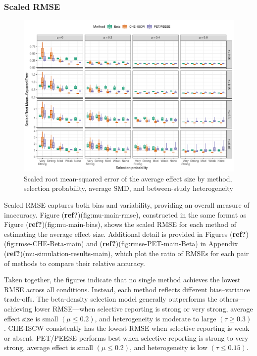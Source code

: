 \documentclass[
  american,
  man, donotrepeattitle,floatsintext]{apa7}
\begin{document}
\subsubsection{Scaled RMSE}\label{scaled-rmse}

\begin{figure}
\includegraphics{beta-function-selection-models-with-dependent-effects_files/figure-latex/mu-rmse-main-1} \caption{Scaled root mean-squared error of the average effect size by method, selection probability, average SMD, and between-study heterogeneity}\label{fig:mu-rmse-main}
\end{figure}

Scaled RMSE captures both bias and variability, providing an overall measure of inaccuracy. Figure (\textbf{ref?})(fig:mu-main-rmse), constructed in the same format as Figure (\textbf{ref?})(fig:mu-main-bias), shows the scaled RMSE for each method of estimating the average effect size. Additional detail is provided in Figures (\textbf{ref?})(fig:rmse-CHE-Beta-main) and (\textbf{ref?})(fig:rmse-PET-main-Beta) in Appendix (\textbf{ref?})(mu-simulation-results-main), which plot the ratio of RMSEs for each pair of methods to compare their relative accuracy.

Taken together, the figures indicate that no single method achieves the lowest RMSE across all conditions. Instead, each method reflects different bias--variance trade-offs.
The beta-density selection model generally outperforms the others---achieving lower RMSE---when selective reporting is strong or very strong, average effect size is small \((\mu \leq 0.2)\), and heterogeneity is moderate to large \((\tau \geq 0.3)\).
CHE-ISCW consistently has the lowest RMSE when selective reporting is weak or absent.
PET/PEESE performs best when selective reporting is strong to very strong, average effect is small \((\mu \leq 0.2)\), and heterogeneity is low \((\tau \leq 0.15)\).
\end{document}

